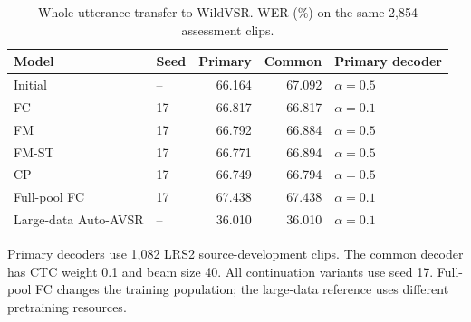 \begin{table}[tbp]
\centering\small
\caption{Whole-utterance transfer to WildVSR. WER (\%) on the same 2,854 assessment clips.}
\label{tab:en}
\begin{tabular}{llrrl}
\toprule
Model & Seed & Primary & Common & Primary decoder \\
\midrule
Initial & -- & 66.164 & 67.092 & $\alpha=0.5$ \\
FC & 17 & 66.817 & 66.817 & $\alpha=0.1$ \\
FM & 17 & 66.792 & 66.884 & $\alpha=0.5$ \\
FM-ST & 17 & 66.771 & 66.894 & $\alpha=0.5$ \\
CP & 17 & 66.749 & 66.794 & $\alpha=0.5$ \\
Full-pool FC & 17 & 67.438 & 67.438 & $\alpha=0.1$ \\
Large-data Auto-AVSR & -- & 36.010 & 36.010 & $\alpha=0.1$ \\
\bottomrule
\end{tabular}
\par\smallskip\begin{minipage}{\linewidth}\footnotesize Primary decoders use 1,082 LRS2 source-development clips. The common decoder has CTC weight 0.1 and beam size 40. All continuation variants use seed 17. Full-pool FC changes the training population; the large-data reference uses different pretraining resources.
\end{minipage}
\end{table}
